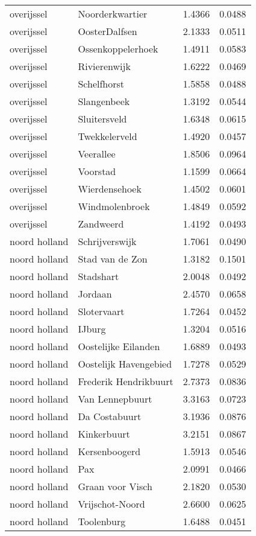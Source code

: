 \begin{longtable}{llcc}
overijssel & Noorderkwartier & 1.4366 & 0.0488 \\
overijssel & OosterDalfsen & 2.1333 & 0.0511 \\
overijssel & Ossenkoppelerhoek & 1.4911 & 0.0583 \\
overijssel & Rivierenwijk & 1.6222 & 0.0469 \\
overijssel & Schelfhorst & 1.5858 & 0.0488 \\
overijssel & Slangenbeek & 1.3192 & 0.0544 \\
overijssel & Sluitersveld & 1.6348 & 0.0615 \\
overijssel & Twekkelerveld & 1.4920 & 0.0457 \\
overijssel & Veerallee & 1.8506 & 0.0964 \\
overijssel & Voorstad & 1.1599 & 0.0664 \\
overijssel & Wierdensehoek & 1.4502 & 0.0601 \\
overijssel & Windmolenbroek & 1.4849 & 0.0592 \\
overijssel & Zandweerd & 1.4192 & 0.0493 \\
noord holland & Schrijverswijk & 1.7061 & 0.0490 \\
noord holland & Stad van de Zon & 1.3182 & 0.1501 \\
noord holland & Stadshart & 2.0048 & 0.0492 \\
noord holland & Jordaan & 2.4570 & 0.0658 \\
noord holland & Slotervaart & 1.7264 & 0.0452 \\
noord holland & IJburg & 1.3204 & 0.0516 \\
noord holland & Oostelijke Eilanden & 1.6889 & 0.0493 \\
noord holland & Oostelijk Havengebied & 1.7278 & 0.0529 \\
noord holland & Frederik Hendrikbuurt & 2.7373 & 0.0836 \\
noord holland & Van Lennepbuurt & 3.3163 & 0.0723 \\
noord holland & Da Costabuurt & 3.1936 & 0.0876 \\
noord holland & Kinkerbuurt & 3.2151 & 0.0867 \\
noord holland & Kersenboogerd & 1.5913 & 0.0546 \\
noord holland & Pax & 2.0991 & 0.0466 \\
noord holland & Graan voor Visch & 2.1820 & 0.0530 \\
noord holland & Vrijschot-Noord & 2.6600 & 0.0625 \\
noord holland & Toolenburg & 1.6488 & 0.0451 \\

\end{longtable}
